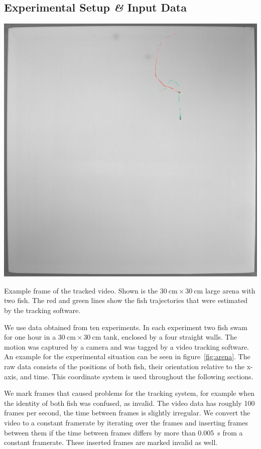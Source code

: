 \documentclass[nobib, a4paper]{tufte-handout}
\begin{document}
\subsection{Experimental Setup \textit{\&} Input Data}
\begin{marginfigure}
\includegraphics[width=\columnwidth]{tracked_frame}
\caption{Example frame of the tracked video.
  Shown is the \(\SI{30}{\cm} \times \SI{30}{\cm}\) large arena with two fish.
  The red and green lines show the fish trajectories that were estimated by the tracking software.
\label{fig:arena}}
\end{marginfigure}

We use data obtained from ten experiments.
In each experiment two fish swam for one hour in a \(\SI{30}{\cm} \times \SI{30}{\cm}\) tank, enclosed by a four straight walls.
The motion was captured by a camera and was tagged by a video tracking software.
An example for the experimental situation can be seen in figure~\ref{fig:arena}.
The raw data consists of the positions of both fish, their orientation relative to the x-axis, and time.
This coordinate system is used throughout the following sections.

We mark frames that caused problems for the tracking system, for example when the identity of both fish was confused, as invalid.
The video data has roughly 100 frames per second, the time between frames is slightly irregular.
We convert the video to a constant framerate by iterating over the frames and inserting frames between them if the time between frames differs by more than \SI{0.005}{\s} from a constant framerate.
These inserted frames are marked invalid as well.
\end{document}
